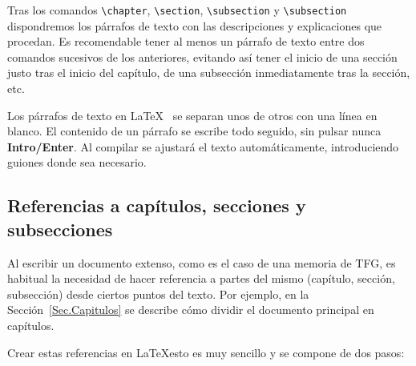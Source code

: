 Tras los comandos \verb|\chapter|, \verb|\section|, \verb|\subsection| y \verb|\subsection| dispondremos los párrafos de texto con las descripciones y explicaciones que procedan. Es recomendable tener al menos un párrafo de texto entre dos comandos sucesivos de los anteriores, evitando así tener el inicio de una sección justo tras el inicio del capítulo, de una subsección inmediatamente tras la sección, etc.

Los párrafos de texto en \LaTeX~ se separan unos de otros con una línea en blanco. El contenido de un párrafo se escribe todo seguido, sin pulsar nunca \textbf{Intro/Enter}. Al compilar se ajustará el texto automáticamente, introduciendo guiones donde sea necesario.

\subsection{Referencias a capítulos, secciones y subsecciones}\label{Sec.Referencias}

Al escribir un documento extenso, como es el caso de una memoria de TFG, es habitual la necesidad de hacer referencia a partes del mismo (capítulo, sección, subsección) desde ciertos puntos del texto. Por ejemplo, en la Sección~\ref{Sec.Capitulos} se describe cómo dividir el documento principal en capítulos.

Crear estas referencias en \LaTeX esto es muy sencillo y se compone de dos pasos:

